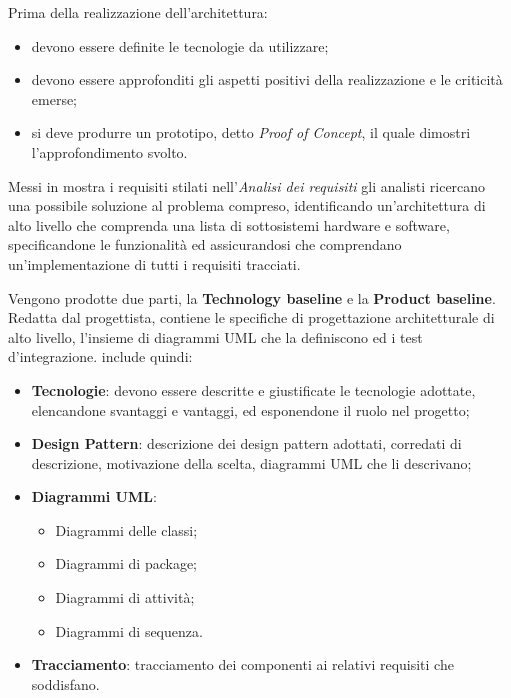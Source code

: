 		Prima della realizzazione dell'architettura:
		\begin{itemize}
			\item devono essere definite le tecnologie da utilizzare;
			\item devono essere approfonditi gli aspetti positivi della realizzazione e le criticità emerse;
			\item si deve produrre un prototipo, detto \textit{Proof of Concept}, il quale dimostri l'approfondimento svolto.
		\end{itemize}
		Messi in mostra i requisiti stilati nell'\textit{Analisi dei requisiti} gli analisti ricercano una possibile soluzione al problema compreso, identificando un'architettura di alto livello che comprenda una lista di sottosistemi hardware e software, specificandone le funzionalità ed assicurandosi che comprendano un'implementazione di tutti i requisiti tracciati.
		
		Vengono prodotte due parti, la \textbf{Technology baseline} e la \textbf{Product baseline}.
		Redatta dal progettista, contiene le specifiche di progettazione architetturale di alto livello, l'insieme di diagrammi UML che la definiscono ed i test d'integrazione.\newline
		include quindi:
		\begin{itemize}
		    \item \textbf{Tecnologie}: devono essere descritte e giustificate le tecnologie adottate, elencandone svantaggi e vantaggi, ed esponendone il ruolo nel progetto;
		    \item \textbf{Design Pattern}: descrizione dei design pattern adottati, corredati di descrizione, motivazione della scelta, diagrammi UML che li descrivano;
		    \item \textbf{Diagrammi UML}:
		    \begin{itemize}
		        \item Diagrammi delle classi;
		        \item Diagrammi di package;
		        
		        \item Diagrammi di attività;
		        \item Diagrammi di sequenza.
		    \end{itemize}
		    \item \textbf{Tracciamento}: tracciamento dei componenti ai relativi requisiti che soddisfano.
		\end{itemize}
